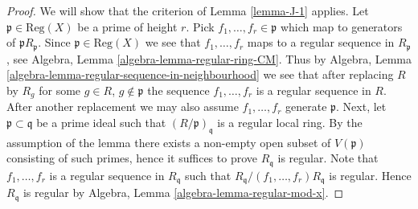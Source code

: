 \documentclass[10pt,a4paper]{amsart}
\theoremstyle{plain}
\theoremstyle{definition}
\theoremstyle{remark}
\numberwithin{equation}{subsection}
\begin{document}
\begin{proof}
We will show that the criterion of Lemma \ref{lemma-J-1} applies.
Let $\mathfrak p \in \text{Reg}(X)$ be a prime of height $r$.
Pick $f_1, \ldots, f_r \in \mathfrak p$ which map to generators
of $\mathfrak pR_\mathfrak p$. Since $\mathfrak p \in \text{Reg}(X)$
we see that $f_1, \ldots, f_r$ maps to a regular sequence in $R_\mathfrak p$,
see Algebra, Lemma \ref{algebra-lemma-regular-ring-CM}. Thus by
Algebra, Lemma \ref{algebra-lemma-regular-sequence-in-neighbourhood}
we see that after replacing $R$ by $R_g$ for some $g \in R$,
$g \not \in \mathfrak p$ the sequence $f_1, \ldots, f_r$ is a
regular sequence in $R$. After another replacement we may also
assume $f_1, \ldots, f_r$ generate $\mathfrak p$.
Next, let $\mathfrak p \subset \mathfrak q$
be a prime ideal such that $(R/\mathfrak p)_\mathfrak q$ is
a regular local ring. By the assumption of the lemma there
exists a non-empty open subset of $V(\mathfrak p)$ consisting
of such primes, hence it suffices to prove $R_\mathfrak q$ is regular.
Note that $f_1, \ldots, f_r$ is a regular sequence in $R_\mathfrak q$
such that $R_\mathfrak q/(f_1, \ldots, f_r)R_\mathfrak q$ is regular.
Hence $R_\mathfrak q$ is regular by
Algebra, Lemma \ref{algebra-lemma-regular-mod-x}.
\end{proof}
\end{document}
